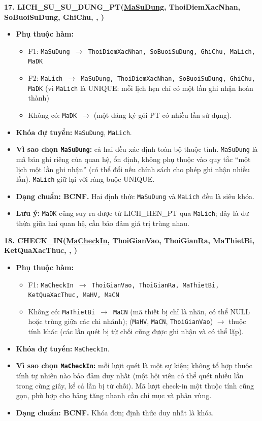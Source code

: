\documentclass[11pt, a4paper]{article}
\newcommand{\pk}[1]{\bgroup\ULdepth=1.8pt\uline{#1}\egroup}
\newcommand{\fk}[1]{\bgroup\ULdepth=1.8pt\dashuline{#1}\egroup}
\begin{document}
\textbf{17. LICH\_SU\_SU\_DUNG\_PT(\pk{MaSuDung}, ThoiDiemXacNhan, SoBuoiSuDung, GhiChu, \fk{MaLich}, \fk{MaDK})}
\begin{itemize}
    \item \textbf{Phụ thuộc hàm:}
    \begin{itemize}
        \item F1: \texttt{MaSuDung $\rightarrow$ ThoiDiemXacNhan, SoBuoiSuDung, GhiChu, MaLich, MaDK}
        \item F2: \texttt{MaLich $\rightarrow$ MaSuDung, ThoiDiemXacNhan, SoBuoiSuDung, GhiChu, MaDK} (vì \texttt{MaLich} là UNIQUE: mỗi lịch hẹn chỉ có một lần ghi nhận hoàn thành)
        \item Không có: \texttt{MaDK $\rightarrow$} (một đăng ký gói PT có nhiều lần sử dụng).
    \end{itemize}
    \item \textbf{Khóa dự tuyển:} \texttt{MaSuDung}, \texttt{MaLich}.
    \item \textbf{Vì sao chọn \texttt{MaSuDung}:} cả hai đều xác định toàn bộ thuộc tính. \texttt{MaSuDung} là mã bản ghi riêng của quan hệ, ổn định, không phụ thuộc vào quy tắc ``một lịch một lần ghi nhận'' (có thể đổi nếu chính sách cho phép ghi nhận nhiều lần). \texttt{MaLich} giữ lại với ràng buộc UNIQUE.
    \item \textbf{Dạng chuẩn: BCNF.} Hai định thức \texttt{MaSuDung} và \texttt{MaLich} đều là siêu khóa.
    \item \textbf{Lưu ý:} \texttt{MaDK} cũng suy ra được từ LICH\_HEN\_PT qua \texttt{MaLich}; đây là dư thừa giữa hai quan hệ, cần bảo đảm giá trị trùng nhau.
\end{itemize}

\textbf{18. CHECK\_IN(\pk{MaCheckIn}, ThoiGianVao, ThoiGianRa, MaThietBi, KetQuaXacThuc, \fk{MaHV}, \fk{MaCN})}
\begin{itemize}
    \item \textbf{Phụ thuộc hàm:}
    \begin{itemize}
        \item F1: \texttt{MaCheckIn $\rightarrow$ ThoiGianVao, ThoiGianRa, MaThietBi, KetQuaXacThuc, MaHV, MaCN}
        \item Không có: \texttt{MaThietBi $\rightarrow$ MaCN} (mã thiết bị chỉ là nhãn, có thể NULL hoặc trùng giữa các chi nhánh); (\texttt{MaHV}, \texttt{MaCN}, \texttt{ThoiGianVao}) $\rightarrow$ thuộc tính khác (các lần quét bị từ chối cũng được ghi nhận và có thể lặp).
    \end{itemize}
    \item \textbf{Khóa dự tuyển:} \texttt{MaCheckIn}.
    \item \textbf{Vì sao chọn \texttt{MaCheckIn}:} mỗi lượt quét là một sự kiện; không tổ hợp thuộc tính tự nhiên nào bảo đảm duy nhất (một hội viên có thể quét nhiều lần trong cùng giây, kể cả lần bị từ chối). Mã lượt check-in một thuộc tính cũng gọn, phù hợp cho bảng tăng nhanh cần chỉ mục và phân vùng.
    \item \textbf{Dạng chuẩn: BCNF.} Khóa đơn; định thức duy nhất là khóa.
\end{itemize}
\end{document}
